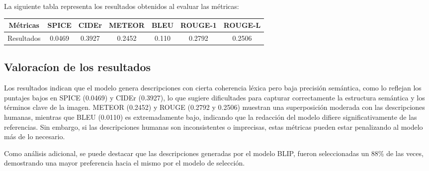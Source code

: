 La siguiente tabla representa los resultados obtenidos al evaluar las métricas:

\begin{table}[h!]
    \begin{tabular}{|c|c|c|c|c|c|c|}
    \hline
    Métricas & SPICE & CIDEr & METEOR & BLEU & ROUGE-1 & ROUGE-L \\ \hline
    Resultados & 0.0469 & 0.3927 & 0.2452 & 0.110 & 0.2792 & 0.2506 \\ \hline
    \end{tabular}
\end{table}

\subsection*{Valoracíon de los resultados}
    Los resultados indican que el modelo genera descripciones con cierta coherencia léxica pero baja precisión semántica, como lo reflejan los puntajes bajos en SPICE (0.0469) y CIDEr (0.3927), lo que sugiere dificultades para capturar correctamente la estructura semántica y los términos clave de la imagen. METEOR (0.2452) y ROUGE (0.2792 y 0.2506) muestran una superposición moderada con las descripciones humanas, mientras que BLEU (0.0110) es extremadamente bajo, indicando que la redacción del modelo difiere significativamente de las referencias. Sin embargo, si las descripciones humanas son inconsistentes o imprecisas, estas métricas pueden estar penalizando al modelo más de lo necesario.

    Como análisis adicional, se puede destacar que las descripciones generadas por el modelo BLIP, fueron seleccionadas un 88\% de las veces, demostrando una mayor preferencia hacia el mismo por el modelo de selección.